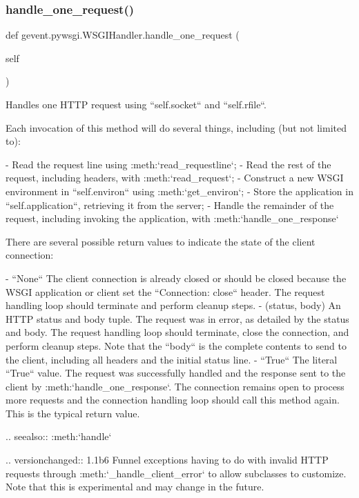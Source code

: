 \subsubsection{\texorpdfstring{handle\+\_\+one\+\_\+request()}{handle\_one\_request()}}
{\footnotesize\ttfamily def gevent.\+pywsgi.\+W\+S\+G\+I\+Handler.\+handle\+\_\+one\+\_\+request (\begin{DoxyParamCaption}\item[{}]{self }\end{DoxyParamCaption})}

\begin{DoxyVerb}Handles one HTTP request using ``self.socket`` and ``self.rfile``.

Each invocation of this method will do several things, including (but not limited to):

- Read the request line using :meth:`read_requestline`;
- Read the rest of the request, including headers, with :meth:`read_request`;
- Construct a new WSGI environment in ``self.environ`` using :meth:`get_environ`;
- Store the application in ``self.application``, retrieving it from the server;
- Handle the remainder of the request, including invoking the application,
  with :meth:`handle_one_response`

There are several possible return values to indicate the state
of the client connection:

- ``None``
    The client connection is already closed or should
    be closed because the WSGI application or client set the
    ``Connection: close`` header. The request handling
    loop should terminate and perform cleanup steps.
- (status, body)
    An HTTP status and body tuple. The request was in error,
    as detailed by the status and body. The request handling
    loop should terminate, close the connection, and perform
    cleanup steps. Note that the ``body`` is the complete contents
    to send to the client, including all headers and the initial
    status line.
- ``True``
    The literal ``True`` value. The request was successfully handled
    and the response sent to the client by :meth:`handle_one_response`.
    The connection remains open to process more requests and the connection
    handling loop should call this method again. This is the typical return
    value.

.. seealso:: :meth:`handle`

.. versionchanged:: 1.1b6
   Funnel exceptions having to do with invalid HTTP requests through
   :meth:`_handle_client_error` to allow subclasses to customize. Note that
   this is experimental and may change in the future.
\end{DoxyVerb}
 \mbox{\label{classgevent_1_1pywsgi_1_1_w_s_g_i_handler_a6d7a625a107d805c77c9ac6b30fae3b2}} 

